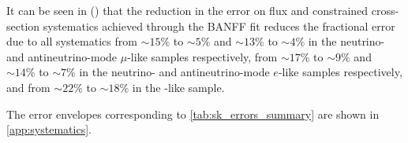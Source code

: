 It can be seen in  () that the reduction in the error on flux and constrained cross-section systematics achieved through the BANFF fit reduces the fractional error due to all systematics from $\sim 15\%$ to $\sim 5\%$ and $\sim 13\%$ to $\sim 4\%$ in the neutrino- and antineutrino-mode $\mu$-like samples respectively, from $\sim 17\%$ to $\sim 9\%$ and $\sim 14\%$ to $\sim 7\%$ in the neutrino- and antineutrino-mode $e$-like samples respectively, and from $\sim 22\%$ to $\sim 18\%$ in the \nueCConepi{}-like sample.



The error envelopes corresponding to \cref{tab:sk_errors_summary} are shown in \cref{app:systematics}.

\clearpage



